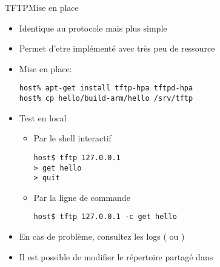\begin{frame}[fragile=singleslide]{TFTP}{Mise en place}
  \begin{itemize}
  \item Identique au protocole  mais plus simple
  \item Permet d'etre implémenté avec très peu de ressource
  \item Mise en place:
    \begin{lstlisting}
host% apt-get install tftp-hpa tftpd-hpa
host% cp hello/build-arm/hello /srv/tftp
    \end{lstlisting}
  \item Test en local
    \begin{itemize}
    \item Par le shell interactif
      \begin{lstlisting}
host$ tftp 127.0.0.1
> get hello
> quit
      \end{lstlisting}
    \item Par la ligne de commande
      \begin{lstlisting}
host$ tftp 127.0.0.1 -c get hello
      \end{lstlisting} %
    \end{itemize}
  \item En cas de  problème, consultez les logs (
    ou )
  \item  Il  est  possible  de  modifier le  répertoire  partagé  dans
  \end{itemize}
\end{frame}  

